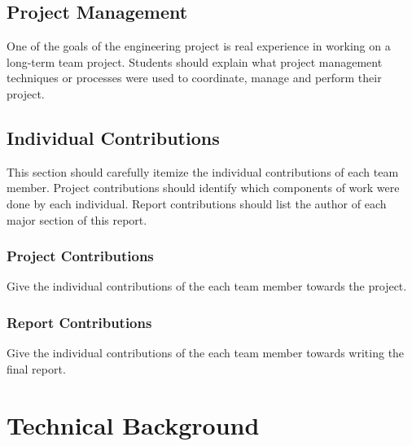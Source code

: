 \documentclass[12pt]{report}
\begin{document}
\section{Project Management}

One of the goals of the engineering project is real experience in working on a long-term team project.  Students should explain what project management techniques or processes were used to coordinate, manage and perform their project.


\section{Individual Contributions}

This section should carefully itemize the individual contributions of each team member. Project contributions should identify which components of work were done by each individual.  Report contributions should list the author of each major section of this report.


\subsection{Project Contributions}

Give the individual contributions of the each team member towards the project.


\subsection{Report Contributions}

Give the individual contributions of the each team member towards writing the
final report.


\chapter{Technical Background}

\end{document}
